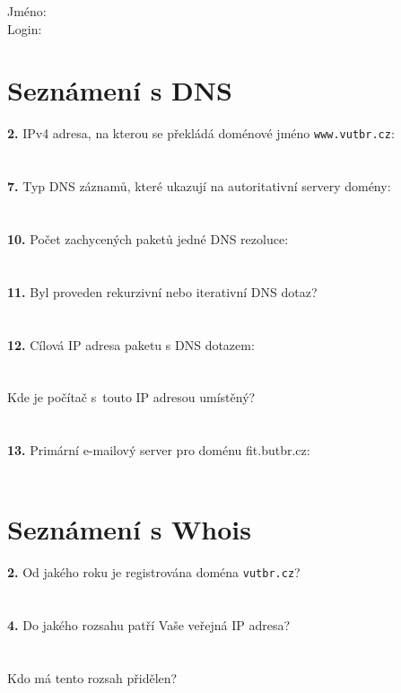 Jméno:\\
Login:\\

\section{Seznámení s DNS}
\textbf{2.} IPv4 adresa, na kterou se překládá doménové jméno {\tt www.vutbr.cz}:\\
\\
\\
\textbf{7.} Typ DNS záznamů, které ukazují na autoritativní servery domény:\\
\\
\\
\textbf{10.} Počet zachycených paketů jedné DNS rezoluce: \\
\\
\\
\textbf{11.} Byl proveden rekurzivní nebo iterativní DNS dotaz?\\
\\
\\
\textbf{12.} Cílová IP adresa paketu s DNS dotazem:\\
\\
\\
Kde je počítač s~touto IP adresou umístěný?\\
\\
\\
\textbf{13.} Primární e-mailový server pro doménu fit.butbr.cz:\\
\\


\section{Seznámení s Whois}
\textbf{2.} Od jakého roku je registrována doména {\tt vutbr.cz}?\\
\\
\\
\textbf{4.} Do jakého rozsahu patří Vaše veřejná IP adresa?\\
\\
\\
Kdo má tento rozsah přidělen?\\
\\
\\
\\
\\
\\
\\
\\
\\

